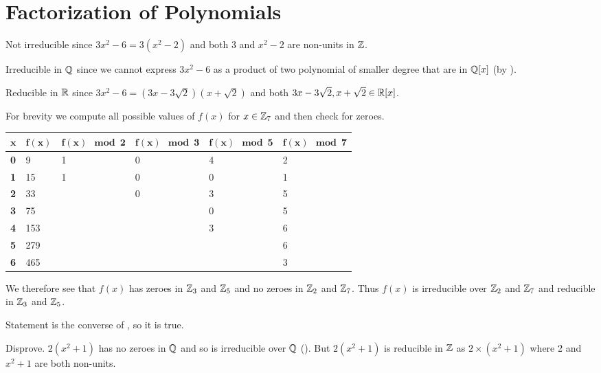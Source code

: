 \section{Factorization of Polynomials}
\begin{questions}
    \item \begin{partquestions}{\alph*}
        \item Not irreducible since $3x^2 - 6 = 3(x^2-2)$ and both 3 and $x^2-2$ are non-units in $\mathbb{Z}$.
        \item Irreducible in $\mathbb{Q}$ since we cannot express $3x^2-6$ as a product of two polynomial of smaller degree that are in $\mathbb{Q}[x]$ (by ).
        \item Reducible in $\mathbb{R}$ since $3x^2 - 6 = (3x-3\sqrt2)(x+\sqrt2)$ and both $3x-3\sqrt2, x+\sqrt2 \in \mathbb{R}[x]$.
    \end{partquestions}
    
    \item For brevity we compute all possible values of $f(x)$ for $x \in \mathbb{Z}_7$ and then check for zeroes.
    \begin{table}[H]
        \centering
        \begin{tabular}{|l|l|l|l|l|l|}
            \hline
            $\boldsymbol{x}$ & $\boldsymbol{f(x)}$ & $\boldsymbol{f(x) \mod2}$ & $\boldsymbol{f(x) \mod3}$ & $\boldsymbol{f(x) \mod5}$ & $\boldsymbol{f(x) \mod7}$ \\ \hline
            \textbf{0} & 9 & 1 & 0 & 4 & 2 \\ \hline
            \textbf{1} & 15 & 1 & 0 & 0 & 1 \\ \hline
            \textbf{2} & 33 &  & 0 & 3 & 5 \\ \hline
            \textbf{3} & 75 &  &  & 0 & 5 \\ \hline
            \textbf{4} & 153 &  &  & 3 & 6 \\ \hline
            \textbf{5} & 279 &  &  &  & 6 \\ \hline
            \textbf{6} & 465 &  &  &  & 3 \\ \hline
        \end{tabular}
    \end{table}
    We therefore see that $f(x)$ has zeroes in $\mathbb{Z}_3$ and $\mathbb{Z}_5$ and no zeroes in $\mathbb{Z}_2$ and $\mathbb{Z}_7$. Thus $f(x)$ is irreducible over $\mathbb{Z}_2$ and $\mathbb{Z}_7$ and reducible in $\mathbb{Z}_3$ and $\mathbb{Z}_5$.

    \item \begin{partquestions}{\alph*}
        \item Statement is the converse of , so it is true.
        \item Disprove. $2(x^2+1)$ has no zeroes in $\mathbb{Q}$ and so is irreducible over $\mathbb{Q}$ (). But $2(x^2+1)$ is reducible in $\mathbb{Z}$ as $2 \times (x^2 + 1)$ where 2 and $x^2 + 1$ are both non-units.
    \end{partquestions}


\end{questions}

